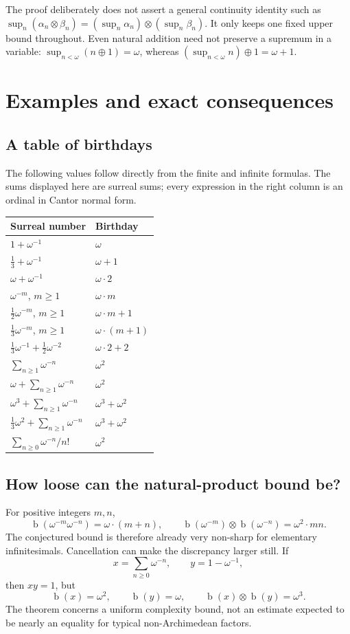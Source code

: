 \documentclass[11pt,letterpaper]{article}
\numberwithin{equation}{section}
\theoremstyle{definition}
\theoremstyle{remark}
\newcommand{\bd}{\operatorname{b}}
\newcommand{\np}{\mathbin{\otimes}}
\begin{document}
The proof deliberately does not assert a general continuity identity such as
$\sup_n(\alpha_n\otimes\beta_n)
=(\sup_n\alpha_n)\otimes(\sup_n\beta_n)$.
It only keeps one fixed upper bound throughout. Even natural addition need
not preserve a supremum in a variable: $\sup_{n<\omega}(n\oplus1)=\omega$,
whereas $(\sup_{n<\omega}n)\oplus1=\omega+1$.

\section{Examples and exact consequences}
\label{sec:examples}
\subsection{A table of birthdays}
The following values follow directly from the finite and infinite formulas.
The sums displayed here are surreal sums; every expression in the right column
is an ordinal in Cantor normal form.

\begin{center}
\renewcommand{\arraystretch}{1.32}
\begin{tabular}{@{}p{}l@{}}
\toprule
Surreal number & Birthday\\
\midrule
$1+\omega^{-1}$ & $\omega$\\
$\tfrac13+\omega^{-1}$ & $\omega+1$\\
$\omega+\omega^{-1}$ & $\omega\cdot2$\\
$\omega^{-m}$, $m\geq1$ & $\omega\cdot m$\\
$\tfrac12\omega^{-m}$, $m\geq1$ & $\omega\cdot m+1$\\
$\tfrac13\omega^{-m}$, $m\geq1$ & $\omega\cdot(m+1)$\\
$\tfrac13\omega^{-1}+\tfrac12\omega^{-2}$ & $\omega\cdot2+2$\\
$\sum_{n\geq1}\omega^{-n}$ & $\omega^2$\\
$\omega+\sum_{n\geq1}\omega^{-n}$ & $\omega^2$\\
$\omega^3+\sum_{n\geq1}\omega^{-n}$ & $\omega^3+\omega^2$\\
$\tfrac13\omega^2+\sum_{n\geq1}\omega^{-n}$ & $\omega^3+\omega^2$\\
$\sum_{n\geq0}\omega^{-n}/n!$ & $\omega^2$\\
\bottomrule
\end{tabular}
\end{center}

\subsection{How loose can the natural-product bound be?}
For positive integers $m,n$,
\[
 \bd(\omega^{-m}\omega^{-n})=\omega\cdot(m+n),
 \qquad
 \bd(\omega^{-m})\np\bd(\omega^{-n})=\omega^2\cdot mn.
\]
The conjectured bound is therefore already very non-sharp for elementary
infinitesimals. Cancellation can make the discrepancy larger still. If
\[
 x=\sum_{n\geq0}\omega^{-n},\qquad y=1-\omega^{-1},
\]
then $xy=1$, but
\[
 \bd(x)=\omega^2,\qquad\bd(y)=\omega,
 \qquad\bd(x)\np\bd(y)=\omega^3.
\]
The theorem concerns a uniform complexity bound, not an estimate expected to
be nearly an equality for typical non-Archimedean factors.
\end{document}
